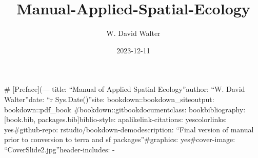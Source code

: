 \documentclass[
  letterpaper,
  DIV=11,
  numbers=noendperiod]{scrreprt}
\title{Manual-Applied-Spatial-Ecology}
\author{W. David Walter}
\date{2023-12-11}
\renewcommand*\contentsname{Table of contents}
\newcommand\contentsname{Table of contents}
\begin{document}
\maketitle
\ifdefined\Shaded\renewenvironment{Shaded}{\begin{tcolorbox}[boxrule=0pt, sharp corners, frame hidden, enhanced, borderline west={3pt}{0pt}{shadecolor}, interior hidden, breakable]}{\end{tcolorbox}}\fi

\renewcommand*\contentsname{Table of contents}
{
\hypersetup{linkcolor=}
\setcounter{tocdepth}{2}
\tableofcontents
}
\# {[}Preface{]}(--- title: ``Manual of Applied Spatial Ecology''author:
``W. David Walter''date: ``r Sys.Date()''site:
bookdown::bookdown\_siteoutput: bookdown::pdf\_book
\#bookdown::gitbookdocumentclass: bookbibliography: {[}book.bib,
packages.bib{]}biblio-style: apalikelink-citations: yescolorlinks:
yes\#github-repo: rstudio/bookdown-demodescription: ``Final version of
manual prior to conversion to terra and sf packages''\#graphics:
yes\#cover-image: ``CoverSlide2.jpg''header-includes: -

\usepackage{titling}
\end{document}
